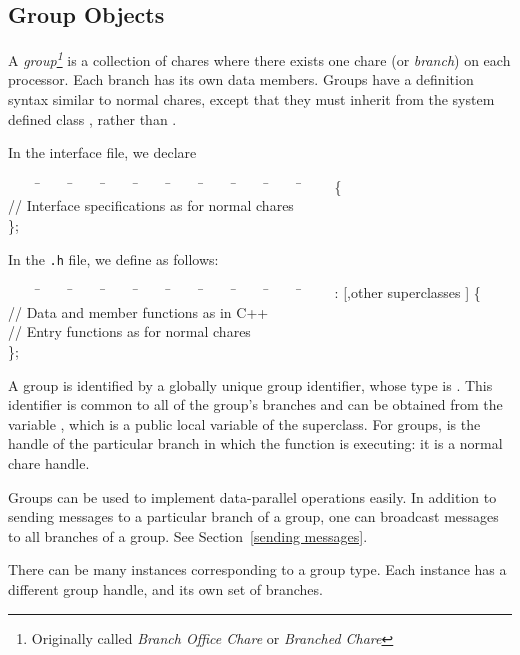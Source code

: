 \subsection{Group Objects}

A {\sl group\footnote{Originally called {\em Branch Office Chare} or 
{\em Branched Chare}}} is a collection of chares where 
there exists one chare (or {\sl branch}) on each
processor.   Each branch has its own data members.  Groups have
a definition syntax similar to normal chares, except that they must
inherit from the system defined class , rather than
.

In the interface file, we declare

\begin{tabbing}
~~~~ \=~~~~ \=~~~~ \=~~~~ \=~~~~ \=~~~~ \=~~~~ \=~~~~ \=~~~~ \=~~~~ \kill
\>   \{ \\
\> \>  // Interface specifications as for normal chares \\
\> \};
\end{tabbing}

In the {\tt .h} file, we define  as follows:

\begin{tabbing}
~~~~ \=~~~~ \=~~~~ \=~~~~ \=~~~~ \=~~~~ \=~~~~ \=~~~~ \=~~~~ \=~~~~ \kill
\>   :  [,other superclasses
] \{ \\
\> \> // Data and member functions as in C++ \\
\> \> // Entry functions as for normal chares \\
\> \};
\end{tabbing}

A group is identified by a globally unique group identifier, whose type is
. This identifier is common to all of the 
group's branches and can be obtained from the variable ,
which is a public local variable of the  
superclass.  For groups,   is the handle of 
the particular branch in which the function is executing: it is 
a normal chare handle.

Groups can be used to implement data-parallel operations easily.
In addition to sending messages to a particular branch of a group, one can 
broadcast messages to all branches of a group.
See Section~\ref{sending messages}.

There can be many instances corresponding to a group type.  Each
instance has a different group handle, and its own set of branches.

